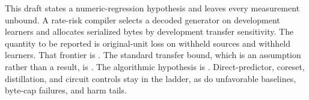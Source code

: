This draft states a numeric-regression hypothesis and leaves every measurement unbound.
A rate-risk compiler selects a decoded generator on development learners and allocates serialized bytes by development transfer sensitivity.
The quantity to be reported is original-unit loss on withheld sources and withheld learners.
That frontier is .
The standard transfer bound, which is an assumption rather than a result, is .
The algorithmic hypothesis is .
Direct-predictor, coreset, distillation, and circuit controls stay in the ladder, as do unfavorable baselines, byte-cap failures, and harm tails.
